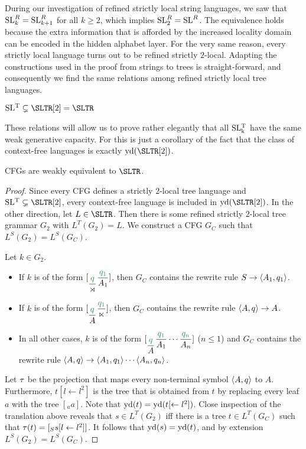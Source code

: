 During our investigation of refined strictly local string languages, we saw that $\SL^R_k = \SL^R_{k+1}$ for all $k \geq 2$, which implies $\SL^R_2 = \SL^R$.
The equivalence holds because the extra information that is afforded by the increased locality domain can be encoded in the hidden alphabet layer.
For the very same reason, every strictly local language turns out to be refined strictly $2$-local.
Adapting the constructions used in the proof from strings to trees is straight-forward, and consequently we find the same relations among refined strictly local tree languages.
%
\begin{theorem}
    $\SLT \subsetneq \SLTR[2] = \SLTR$
\end{theorem}
%
These relations will allow us to prove rather elegantly that all $\SLT[k]$ have the same weak generative capacity.
For this is just a corollary of the fact that the class of context-free languages is exactly $\Yield(\SLTR[2])$.
%
\begin{theorem}
    CFGs are weakly equivalent to $\SLTR$.
\end{theorem}
%
\begin{proof}
    Since every CFG defines a strictly $2$-local tree language and $\SLT \subsetneq \SLTR[2]$, every context-free language is included in $\Yield(\SLTR[2])$.
    In the other direction, let $L \in \SLTR$.
    Then there is some refined strictly $2$-local tree grammar $G_2$ with $L^T(G_2) = L$.
    We construct a CFG $G_C$ such that $L^S(G_2) = L^S(G_C)$.

    Let $k \in G_2$.
    \begin{itemize}
        \item If $k$ is of the form $[_{\kState{q}{\LeftEdge}} \kState{q_1}{A_1}]$, then $G_C$ contains the rewrite rule $S \rewrite \tuple{A_1,q_1}$.
        \item If $k$ is of the form $[_{\kState{q}{A}} \kState{q_1}{\RightEdge}]$, then $G_C$ contains the rewrite rule $\tuple{A,q} \rewrite A$.
        \item In all other cases, $k$ is of the form $[_{\kState{q}{A}} \kState{q_1}{A_1} \cdots \kState{q_n}{A_n}]$ ($n \leq 1$) and $G_C$ contains the rewrite rule $\tuple{A,q} \rewrite \tuple{A_1,q_1} \cdots \tuple{A_n,q_n}$.
    \end{itemize}

    Let $\transduction$ be the projection that maps every non-terminal symbol $\tuple{A,q}$ to $A$.
    Furthermore, $t[l \leftarrow l^2]$ is the tree that is obtained from $t$ by replacing every leaf $a$ with the tree $[_a a]$.
    Note that $\Yield(t) = \Yield(t[ \leftarrow l^2])$.
    Close inspection of the translation above reveals that $s \in L^T(G_2)$ iff there is a tree $t \in L^T(G_C)$ such that $\transduction(t) = [_S s[l \leftarrow l^2]]$.
    It follows that $\Yield(s) = \Yield(t)$, and by extension $L^S(G_2) = L^S(G_C)$. 
\end{proof}

